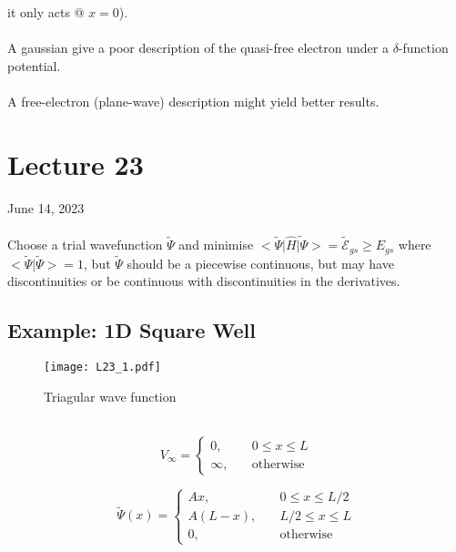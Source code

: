 \documentclass[12pt,fancychapters]{report}
\numberwithin{equation}{section}
\begin{document}
it only acts @ $x=0$).\\
\\
A gaussian give a poor description of the quasi-free electron under a $\delta$-function potential.\\
\\
A free-electron (plane-wave) description might yield better results.
\newpage
\section{Lecture 23}
June 14, 2023\\
\\
Choose a trial wavefunction $\tilde{\Psi}$ and minimise $\big<\tilde{\Psi}\big|\hat{H}\tilde{
\big|\Psi}\big> = \tilde{\mathcal{E}}_{gs} \geq E_{gs}$ where $\big<\tilde{\Psi}\big|\tilde
{\Psi}\big> = 1$, but $\tilde{\Psi}$ should be a piecewise continuous, but may have discontinuities 
or be continuous with discontinuities in the derivatives.

\subsection{Example: 1D Square Well}
\begin{wrapfigure}{l}{0.4\textwidth}
  \begin{center}
\texttt{[image: L23\_1.pdf]}
  \end{center}
  \caption{Triagular wave function}
\end{wrapfigure}
\
\
\[
V_\infty =
\begin{cases}
  0, & \quad 0 \leq x \leq L\\
  \infty, & \quad \text{otherwise}
\end{cases}
\]

\[
  \tilde{\Psi} (x) = 
  \begin{cases}
    Ax, & \quad 0\leq x \leq L/2\\
    A(L-x), & \quad L/2 \leq x \leq L\\
    0, & \quad \text{otherwise}
  \end{cases}
\]
\end{document}
